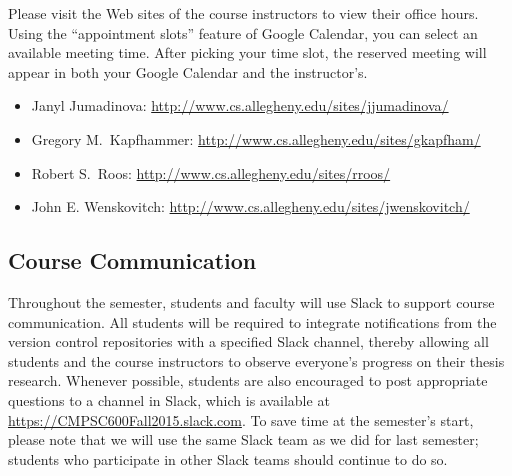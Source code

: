 Please visit the Web sites of the course instructors to view their office hours.  Using the ``appointment slots''
feature of Google Calendar, you can select an available meeting time. After picking your time slot, the reserved meeting
will appear in both your Google Calendar and the instructor's.

\vspace*{-.1in}
\begin{itemize}
    \itemsep -.25em
        \item Janyl Jumadinova: \url{http://www.cs.allegheny.edu/sites/jjumadinova/}
        \item Gregory M.\ Kapfhammer: \url{http://www.cs.allegheny.edu/sites/gkapfham/}
        \item Robert S.\ Roos: \url{http://www.cs.allegheny.edu/sites/rroos/}
        \item John E. Wenskovitch: \url{http://www.cs.allegheny.edu/sites/jwenskovitch/}
\end{itemize}

\vspace*{-.35in}
\subsection*{Course Communication}

Throughout the semester, students and faculty will use Slack to support course communication. All students will be
required to integrate notifications from the version control repositories with a specified Slack channel, thereby
allowing all students and the course instructors to observe everyone's progress on their thesis research.  Whenever
possible, students are also encouraged to post appropriate questions to a channel in Slack, which is available at
\url{https://CMPSC600Fall2015.slack.com}. To save time at the semester's start, please note that we will use the same
Slack team as we did for last semester; students who participate in other Slack teams should continue to do so.




